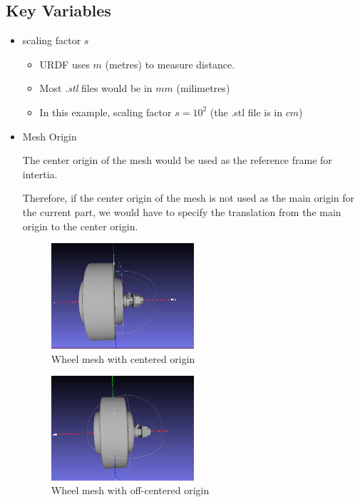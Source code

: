 \documentclass[11pt]{article}
\begin{document}
\subsection{Key Variables}
\begin{itemize}
 \item {
       scaling factor $s$
       \begin{itemize}
        \item {URDF uses $m$ (metres) to measure distance.}
        \item{ Most \emph{.stl} files would be in $mm$ (milimetres) }
        \item{In this example, scaling factor $s=10^2$ (the .stl file is in $cm$)}
       \end{itemize}
       }
 \item{
       Mesh Origin
       
       The center origin of the mesh would be used as the reference frame for intertia.
       
       Therefore, if the center origin of the mesh is not used as the main origin for the current part, we would have to
       specify the translation from the main origin to the center origin.
       
       
       \begin{figure}[!htb]
        \centering
        \includegraphics[width=0.5\textwidth]{images/centeredwheel}
        \caption{Wheel mesh with centered origin}
       \end{figure}
       
       
       \begin{figure}[!htb]
        \centering
        \includegraphics[width=0.5\textwidth]{images/offcenteredwheel}
        \caption{Wheel mesh with off-centered origin}
       \end{figure}
       }
\end{itemize}
\end{document}
